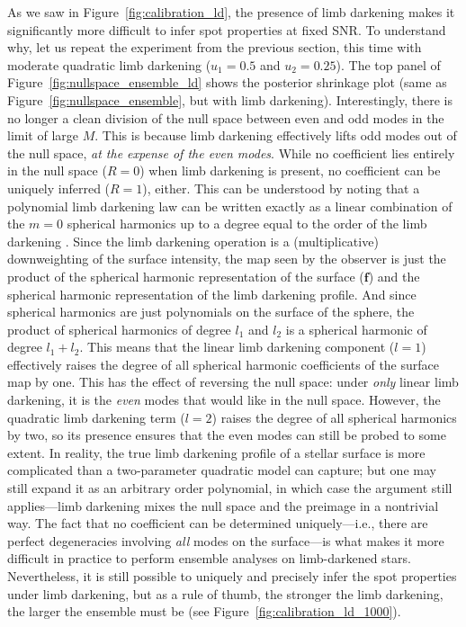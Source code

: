 \documentclass[modern]{aastex62}
\begin{document}
As we saw in Figure~\ref{fig:calibration_ld}, the presence of limb darkening
makes it significantly more difficult to infer spot properties at fixed
SNR. To understand
why, let us repeat the experiment from the previous section,
this time with moderate quadratic limb darkening ($u_1 = 0.5$ and $u_2 = 0.25$).
The top panel of Figure~\ref{fig:nullspace_ensemble_ld} shows the
posterior shrinkage plot (same as Figure~\ref{fig:nullspace_ensemble}, but
with limb darkening). Interestingly, there is no longer a clean division of
the null space between even and odd modes in the limit of large $M$.
This is because limb darkening effectively lifts odd modes out of the null space, \emph{at the
    expense of the even modes}. While no coefficient lies entirely in the
null space ($R = 0$) when limb darkening is present, no coefficient
can be uniquely inferred ($R = 1$), either. This can be understood by noting that
a polynomial limb darkening law can be written
exactly as a linear combination of the $m=0$ spherical harmonics
up to a degree equal to the order of the limb darkening
\citep[in this case, $l = 2$;][and Appendix~\ref{sec:ld}]{Luger2019,Agol2020}.
Since the limb darkening operation is a (multiplicative) downweighting of
the surface intensity, the map seen by the observer is just the product
of the spherical harmonic representation of the surface ($\mathbf{f}$)
and the spherical harmonic representation of the limb darkening profile.
And since spherical harmonics are just polynomials on the surface of the sphere,
the product of spherical harmonics of degree $l_1$ and $l_2$ is a spherical
harmonic of degree $l_1 + l_2$. This means that the linear limb darkening
component ($l = 1$) effectively raises the degree of all spherical harmonic
coefficients of the surface map by one. This has the effect of reversing
the null space: under \emph{only} linear limb darkening, it is the \emph{even}
modes that would like in the null space. However, the quadratic
limb darkening term ($l = 2$) raises the degree of all spherical harmonics by two,
so its presence ensures that the even modes can still be probed to some extent.
In reality, the true limb darkening profile of a stellar surface is more
complicated than a two-parameter quadratic model can capture; but one may still
expand it as an arbitrary order polynomial, in which case the argument still
applies---limb darkening mixes the null space and the preimage in a nontrivial
way. The fact that no coefficient can be determined uniquely---i.e., there are
perfect degeneracies involving \emph{all} modes on the surface---is what makes it more
difficult in practice to perform ensemble analyses on limb-darkened stars.
Nevertheless, it is still possible to uniquely and precisely infer the spot properties
under limb darkening,
but as a rule of thumb, the stronger the limb darkening, the larger the
ensemble must be (see Figure~\ref{fig:calibration_ld_1000}).
\end{document}
